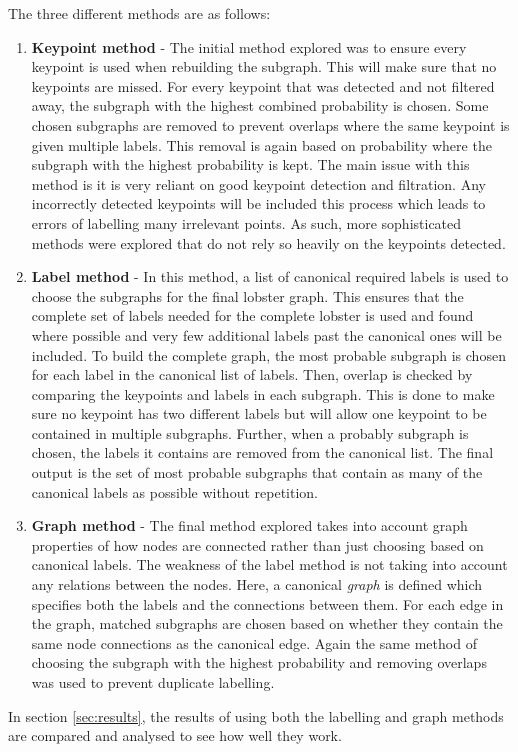 \noindent
The three different methods are as follows:
\begin{enumerate}
\item \textbf{Keypoint method} - The initial method explored was to ensure every keypoint is used when rebuilding the subgraph. This will make sure that no keypoints are missed. For every keypoint that was detected and not filtered away, the subgraph with the highest combined probability is chosen. Some chosen subgraphs are removed to prevent overlaps where the same keypoint is given multiple labels. This removal is again based on probability where the subgraph with the highest probability is kept. The main issue with this method is it is very reliant on good keypoint detection and filtration. Any incorrectly detected keypoints will be included this process which leads to errors of labelling many irrelevant points. As such, more sophisticated methods were explored that do not rely so heavily on the keypoints detected.
\item \textbf{Label method} - In this method, a list of canonical required labels is used to choose the subgraphs for the final lobster graph. This ensures that the complete set of labels needed for the complete lobster is used and found where possible and very few additional labels past the canonical ones will be included. To build the complete graph, the most probable subgraph is chosen for each label in the canonical list of labels. Then, overlap is checked by comparing the keypoints and labels in each subgraph. This is done to make sure no keypoint has two different labels but will allow one keypoint to be contained in multiple subgraphs. Further, when a probably subgraph is chosen, the labels it contains are removed from the canonical list. The final output is the set of most probable subgraphs that contain as many of the canonical labels as possible without repetition. 
\item \textbf{Graph method} - The final method explored takes into account graph properties of how nodes are connected rather than just choosing based on canonical labels. The weakness of the label method is not taking into account any relations between the nodes. Here, a canonical \textit{graph} is defined which specifies both the labels and the connections between them. For each edge in the graph, matched subgraphs are chosen based on whether they contain the same node connections as the canonical edge. Again the same method of choosing the subgraph with the highest probability and removing overlaps was used to prevent duplicate labelling.
\end{enumerate}
\noindent
In section \ref{sec:results}, the results of using both the labelling and graph methods are compared and analysed to see how well they work.


